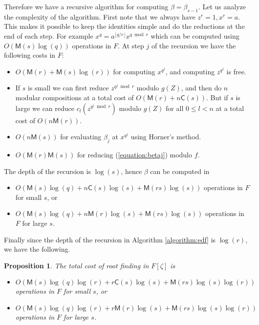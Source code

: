 \documentclass[12pt]{article}
\theoremstyle{plain}
\newtheorem{proposition}[theorem]{Proposition}
\theoremstyle{definition}
\def\MM{\ensuremath{\mathsf{M}}}
\def\CC{\ensuremath{\mathsf{C}}}
\newcounter{algorithm}
\begin{document}
Therefore we have a recursive algorithm for computing $\beta = \beta_{s - 1}$. Let us analyze the 
complexity of the algorithm. First note that we always have $z^r = 1, x^r = a$. This makes it 
possible to keep the identities simple and do the reductions at the end of each step. For example 
$x^q = a^{\lfloor q / r\rfloor}x^{q \bmod r}$ which can be computed using $O(\MM(s)\log(q))$
operations in $F$. At step $j$ of the recursion we have the following costs in $F$:
\begin{itemize}
	\item $O(\MM(r) + \MM(s)\log(r))$ for computing $x^{q^j}$, and computing $z^{q^j}$ is free.
	\item If $s$ is small we can first reduce $z^{q^j \bmod r}$ modulo $g(Z)$, and then do $n$ 
	modular compositions at a total cost
	of $O(\MM(r) + n\CC(s))$. But if $s$ is large we can reduce $c_l(z^{q^j \bmod r})$ modulo 
	$g(Z)$ for all $0 \le l < n$ at a total cost of $O(n\MM(r))$.
	\item $O(n\MM(s))$ for evaluating $\beta_j$ at $x^{q^j}$ using Horner's method.
	\item $O(\MM(r)\MM(s))$ for reducing (\ref{equation:betaj}) modulo $f$.
\end{itemize}
The depth of the recursion is $\log(s)$, hence $\beta$ can be computed in
\begin{itemize}
	\item $O(\MM(s)\log(q) + n\CC(s)\log(s) + \MM(rs)\log(s))$ operations in $F$ for small 
	$s$, or
	\item $O(\MM(s)\log(q) + n\MM(r)\log(s) + \MM(rs)\log(s))$ operations in $F$ for large 
	$s$.
\end{itemize} 
Finally since the depth of the recursion in Algorithm \ref{algorithm:edf} is $\log(r)$, we have 
the 
following.
\begin{proposition}
	\label{proposition:root-fpz}
	The total cost of root finding in $F[\zeta]$ is
	\begin{itemize}
		\item $O(\MM(s)\log(q)\log(r) + r\CC(s)\log(s) + \MM(rs)\log(s)\log(r))$\\ operations 
		in $F$ for small $s$, or
		\item $O(\MM(s)\log(q)\log(r) + r\MM(r)\log(s) + \MM(rs)\log(s)\log(r))$\\ operations 
		in $F$ for large $s$.
	\end{itemize}
\end{proposition}
\end{document}

